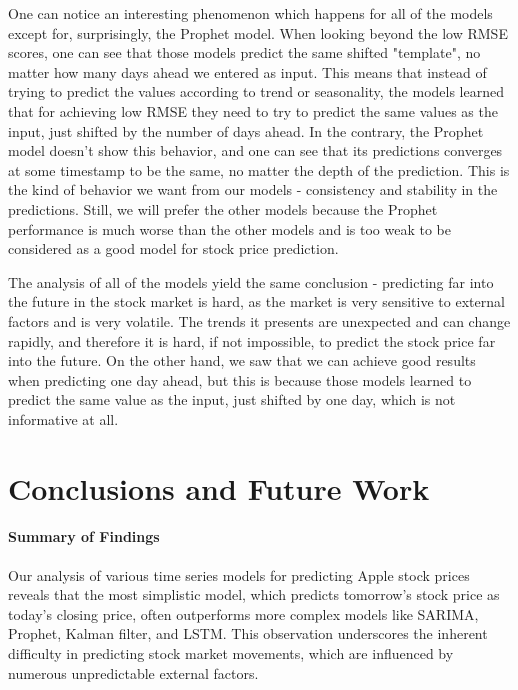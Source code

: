 \documentclass[12pt]{article}
\theoremstyle{definition}
\begin{document}
One can notice an interesting phenomenon which happens for all of the models except for, surprisingly, the Prophet model. 
When looking beyond the low RMSE scores, one can see that those models predict the same shifted "template", no matter how many days ahead we entered as input. 
This means that instead of trying to predict the values according to trend or seasonality, the models learned that for achieving low RMSE they need to try to predict the same values as the input, just shifted by the number of days ahead.
In the contrary, the Prophet model doesn't show this behavior, and one can see that its predictions converges at some timestamp to be the same, no matter the depth of the prediction.
This is the kind of behavior we want from our models - consistency and stability in the predictions.
Still, we will prefer the other models because the Prophet performance is much worse than the other models and is too weak to be considered as a good model for stock price prediction.

The analysis of all of the models yield the same conclusion - predicting far into the future in the stock market is hard, as the market is very sensitive to external factors and is very volatile.
The trends it presents are unexpected and can change rapidly, and therefore it is hard, if not impossible, to predict the stock price far into the future.
On the other hand, we saw that we can achieve good results when predicting one day ahead, but this is because those models learned to predict the same value as the input, just shifted by one day, which is not informative at all.

\section{Conclusions and Future Work}

\paragraph{Summary of Findings}
Our analysis of various time series models for predicting Apple stock prices reveals that the most simplistic model, which predicts tomorrow's stock price as today's closing price, often outperforms more complex models like SARIMA, Prophet, Kalman filter, and LSTM. This observation underscores the inherent difficulty in predicting stock market movements, which are influenced by numerous unpredictable external factors.
\end{document}
